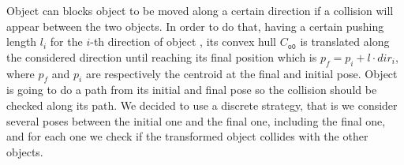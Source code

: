 Object  can blocks object  to be moved along a certain direction if a collision will appear between the two objects. In order to do that, having a certain pushing length $l_i$ for the $i$-th direction of object , its convex hull $C_{\mathtt{o0}}$ is translated along the considered direction until reaching its final position which is $p_f=p_i + l \cdot dir_i$, where $p_f$ and $p_i$ are respectively the centroid at the final and initial pose. Object  is going to do a path from its initial and final pose so the collision should be checked along its path. 
We decided to use a discrete strategy, that is we consider several poses between the initial one and the final one, including the final one, and for each one we check if the transformed object collides with the other objects. 



